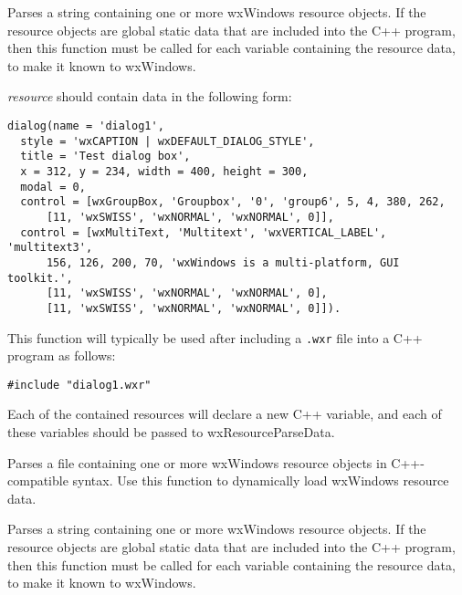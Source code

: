 \label{wxresourcedata}


Parses a string containing one or more wxWindows resource objects. If
the resource objects are global static data that are included into the
C++ program, then this function must be called for each variable
containing the resource data, to make it known to wxWindows.

{\it resource} should contain data in the following form:

\begin{verbatim}
dialog(name = 'dialog1',
  style = 'wxCAPTION | wxDEFAULT_DIALOG_STYLE',
  title = 'Test dialog box',
  x = 312, y = 234, width = 400, height = 300,
  modal = 0,
  control = [wxGroupBox, 'Groupbox', '0', 'group6', 5, 4, 380, 262,
      [11, 'wxSWISS', 'wxNORMAL', 'wxNORMAL', 0]],
  control = [wxMultiText, 'Multitext', 'wxVERTICAL_LABEL', 'multitext3',
      156, 126, 200, 70, 'wxWindows is a multi-platform, GUI toolkit.',
      [11, 'wxSWISS', 'wxNORMAL', 'wxNORMAL', 0],
      [11, 'wxSWISS', 'wxNORMAL', 'wxNORMAL', 0]]).
\end{verbatim}

This function will typically be used after including a {\tt .wxr} file into
a C++ program as follows:

\begin{verbatim}
#include "dialog1.wxr"
\end{verbatim}

Each of the contained resources will declare a new C++ variable, and each
of these variables should be passed to wxResourceParseData.



Parses a file containing one or more wxWindows resource objects
in C++-compatible syntax. Use this function to dynamically load
wxWindows resource data.

\label{wxresourceparsestring}


Parses a string containing one or more wxWindows resource objects. If
the resource objects are global static data that are included into the
C++ program, then this function must be called for each variable
containing the resource data, to make it known to wxWindows.

